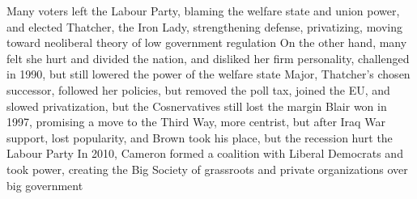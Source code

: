 \documentclass[11 pt, twoside]{article}
\newenvironment{outline*}
{
	\begin{outline}[enumerate]
	}
	{\end{outline}
}
\begin{document}
\begin{outline*}
\3 Many voters left the Labour Party, blaming the welfare state and union power, and elected Thatcher, the Iron Lady, strengthening defense, privatizing, moving toward neoliberal theory of low government regulation
\3 On the other hand, many felt she hurt and divided the nation, and disliked her firm personality, challenged in 1990, but still lowered the power of the welfare state
\2 Major, Thatcher's chosen successor, followed her policies, but removed the poll tax, joined the EU, and slowed privatization, but the Cosnervatives still lost the margin
\3 Blair won in 1997, promising a move to the Third Way, more centrist, but after Iraq War support, lost popularity, and Brown took his place, but the recession hurt the Labour Party
\3 In 2010, Cameron formed a coalition with Liberal Democrats and took power, creating the Big Society of grassroots and private organizations over big government
\end{outline*}
\end{document}
